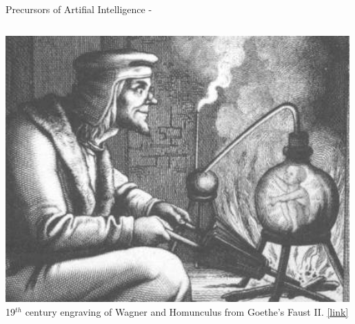 \begin{frame}[t, allowframebreaks]{Precursors of Artifial Intelligence -}
    \begin{columns}[t]
        \begin{column}{0.32\textwidth}
            \begin{center}
                \includegraphics[width=0.99\textwidth]
                {./images/precursors/homunculus_cropped.png}\\
                {\scriptsize 
                \vspace{0.1cm}
                19$^{th}$ century engraving of Wagner and Homunculus 
                from Goethe's Faust II.
                \href{https://en.wikipedia.org/wiki/Homunculus\#/media/File:Faust_image_19thcentury.jpg}{\tiny [link]}\\
                }
            \end{center}
        \end{column}
\end{columns}
\end{frame}
